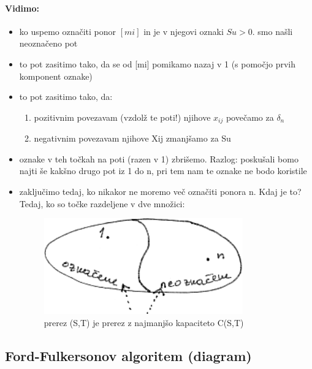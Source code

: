 \documentclass[a4paper,10pt]{article}
\begin{document}
\paragraph{Vidimo:}
\begin{itemize}
\item ko uspemo ozna\v citi ponor $[mi]$ in je v njegovi oznaki $Su > 0$. smo na\v sli neozna\v ceno pot%
\item to pot zasitimo tako, da se od [mi] pomikamo nazaj v 1 (s pomo\v cjo prvih komponent oznake)
\item to pot zasitimo tako, da:
	\begin{enumerate}
	\item pozitivnim povezavam (vzdol\v z te poti!) njihove $x_{ij}$ pove\v camo za $\delta_n$
	\item negativnim povezavam njihove Xij zmanj\v samo za Su
	\end{enumerate}
\item oznake v teh to\v ckah na poti (razen v 1) zbri\v semo. Razlog: posku\v sali bomo najti \v se kak\v sno drugo pot iz 1 do n, pri tem nam te oznake ne bodo koristile
\item zaklju\v cimo tedaj, ko nikakor ne moremo ve\v c ozna\v citi ponora n. Kdaj je to? Tedaj, ko so to\v cke razdeljene v dve mno\v zici:
\begin{flushleft}
\begin{figure}[hbt]
	\centering
	\includegraphics[width=8.57cm,height=4.13cm]{Slike/MaxPretokOznacevanje2.png}
	\caption{prerez (S,T) je prerez z najmanj\v so kapaciteto C(S,T)}
\end{figure}

\end{flushleft}
\end{itemize}

\subsection{Ford-Fulkersonov algoritem (diagram)}
\end{document}
